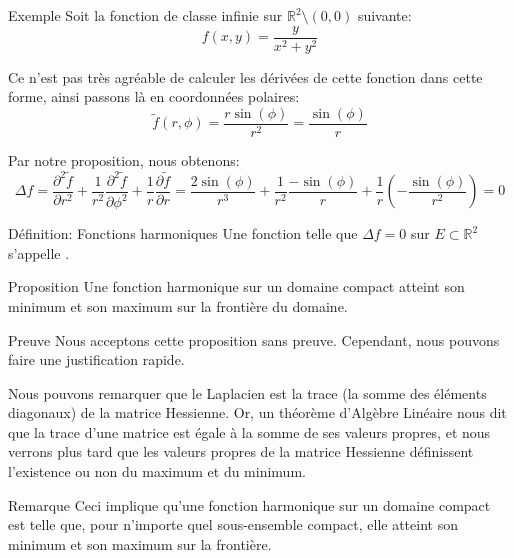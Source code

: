 \documentclass[a4paper]{article}
\begin{document}
\begin{parag}{Exemple}
    Soit la fonction de classe infinie sur $\mathbb{R}^2 \setminus \left(0, 0\right)$ suivante: 
    \[f\left(x, y\right) = \frac{y}{x^2 + y^2}\]
    
    Ce n'est pas très agréable de calculer les dérivées de cette fonction dans cette forme, ainsi passons là en coordonnées polaires: 
    \[\widetilde{f}\left(r, \phi\right) = \frac{r\sin\left(\phi\right)}{r^2} = \frac{\sin\left(\phi\right)}{r}\]

    Par notre proposition, nous obtenons: 
    \[\Delta f = \frac{\partial^2 \widetilde{f}}{\partial r^2} + \frac{1}{r^2} \frac{\partial^2 \widetilde{f}}{\partial \phi^2} + \frac{1}{r} \frac{\partial \widetilde{f}}{\partial r} = \frac{2 \sin\left(\phi\right)}{r^3} + \frac{1}{r^2} \frac{- \sin\left(\phi\right)}{r} + \frac{1}{r} \left(-\frac{\sin\left(\phi\right)}{r^2}\right) = 0\]
\end{parag}

\begin{parag}{Définition: Fonctions harmoniques}
    Une fonction telle que $\Delta f = 0$ sur $E \subset \mathbb{R}^2$ s'appelle .
\end{parag}

\begin{parag}{Proposition}
    Une fonction harmonique sur un domaine compact atteint son minimum et son maximum sur la frontière du domaine.

    \begin{subparag}{Preuve}
        Nous acceptons cette proposition sans preuve. Cependant, nous pouvons faire une justification rapide.

        Nous pouvons remarquer que le Laplacien est la trace (la somme des éléments diagonaux) de la matrice Hessienne. Or, un théorème d'Algèbre Linéaire nous dit que la trace d'une matrice est égale à la somme de ses valeurs propres, et nous verrons plus tard que les valeurs propres de la matrice Hessienne définissent l'existence ou non du maximum et du minimum.
    \end{subparag}
    
    \begin{subparag}{Remarque}
        Ceci implique qu'une fonction harmonique sur un domaine compact est telle que, pour n'importe quel sous-ensemble compact, elle atteint son minimum et son maximum sur la frontière.
    \end{subparag}
\end{parag}
\end{document}
